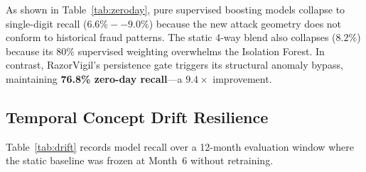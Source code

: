 \documentclass[conference]{IEEEtran}
\begin{document}
\begin{table}[h]
\caption{Zero-Day CVV Cycling Recall (Unobserved During Training, $N=500$)}
\setlength{\tabcolsep}{3pt}
\footnotesize
\label{tab:zeroday}
\centering\small
{}
\end{table}

As shown in Table~\ref{tab:zeroday}, pure supervised boosting models collapse to single-digit recall ($6.6\%--9.0\%$) because the new attack geometry does not conform to historical fraud patterns. The static 4-way blend also collapses ($8.2\%$) because its $80\%$ supervised weighting overwhelms the Isolation Forest. In contrast, RazorVigil's persistence gate triggers its structural anomaly bypass, maintaining \textbf{76.8\% zero-day recall}---a $9.4\times$ improvement.

\subsection{Temporal Concept Drift Resilience}
Table~\ref{tab:drift} records model recall over a 12-month evaluation window where the static baseline was frozen at Month~6 without retraining.
\end{document}
